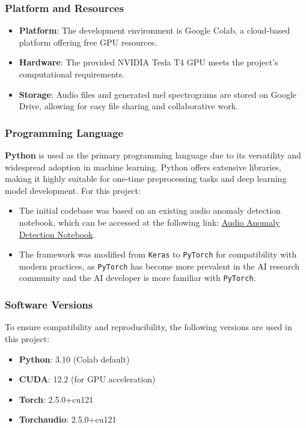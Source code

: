 \documentclass[conference]{IEEEtran}
\begin{document}
\subsubsection{Platform and Resources}
\begin{itemize}
    \item \textbf{Platform}: The development environment is Google Colab, a cloud-based platform offering free GPU resources.
    \item \textbf{Hardware}: The provided NVIDIA Tesla T4 GPU meets the project’s computational requirements.
    \item \textbf{Storage}: Audio files and generated mel spectrograms are stored on Google Drive, allowing for easy file sharing and collaborative work.
\end{itemize}

\subsubsection{Programming Language}
\textbf{Python} is used as the primary programming language due to its versatility and widespread adoption in machine learning. Python offers extensive libraries, making it highly suitable for one-time preprocessing tasks and deep learning model development. For this project:
\begin{itemize}
    \item The initial codebase was based on an existing audio anomaly detection notebook, which can be accessed at the following link: \href{https://colab.research.google.com/github/gefleury/datascientest_anomalous_sounds/blob/main/notebooks/ASD_clf_sounds_DL_from_machine_clf.ipynb#scrollTo=Wl7ZFXd3igl3}{Audio Anomaly Detection Notebook}.
    \item The framework was modified from \texttt{Keras} to \texttt{PyTorch} for compatibility with modern practices, as \texttt{PyTorch} has become more prevalent in the AI research community and the AI developer is more familiar with  \texttt{PyTorch}.
\end{itemize}

\subsubsection{Software Versions}
To ensure compatibility and reproducibility, the following versions are used in this project:
\begin{itemize}
    \item \textbf{Python}: 3.10 (Colab default)
    \item \textbf{CUDA}: 12.2 (for GPU acceleration)
    \item \textbf{Torch}: 2.5.0+cu121
    \item \textbf{Torchaudio}: 2.5.0+cu121
\end{itemize}
\end{document}
